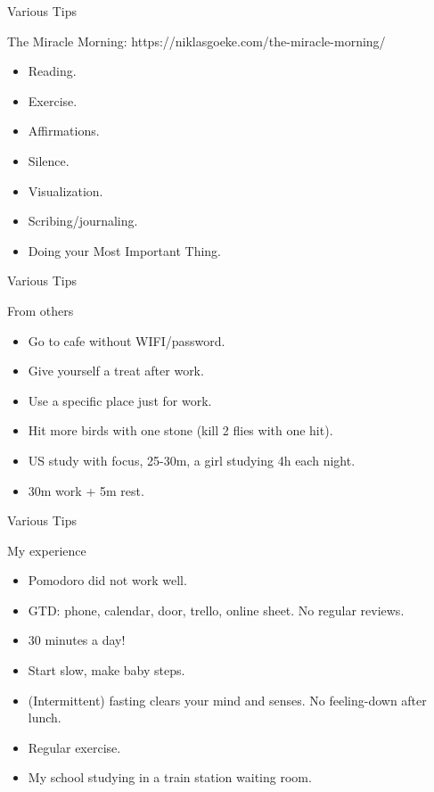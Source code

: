 \begin{frame}{Various Tips}
  \begin{block}{The Miracle Morning: https://niklasgoeke.com/the-miracle-morning/}
    \begin{itemize}
      \item Reading.
      \item Exercise.
      \item Affirmations.
      \item Silence.
      \item Visualization.
      \item Scribing/journaling.
      \item Doing your Most Important Thing.
    \end{itemize}
  \end{block}
\end{frame}

\begin{frame}{Various Tips}
  \begin{block}{From others}
    \begin{itemize}
      \item Go to cafe without WIFI/password.
      \item Give yourself a treat after work.
      \item Use a specific place just for work.
      \item Hit more birds with one stone (kill 2 flies with one hit).
      \item US study with focus, 25-30m, a girl studying 4h each night.
      \item 30m work + 5m rest.
    \end{itemize}
  \end{block}
\end{frame}

\begin{frame}{Various Tips}
  \begin{block}{My experience}
    \begin{itemize}
      \item Pomodoro did not work well. %
      \item GTD: phone, calendar, door, trello, online sheet. No regular reviews.
      \item 30 minutes a day!
      \item Start slow, make baby steps. %
      \item (Intermittent) fasting clears your mind and senses. No feeling-down after lunch.
      \item Regular exercise.
      \item My school studying in a train station waiting room.
    \end{itemize}
  \end{block}
\end{frame}

